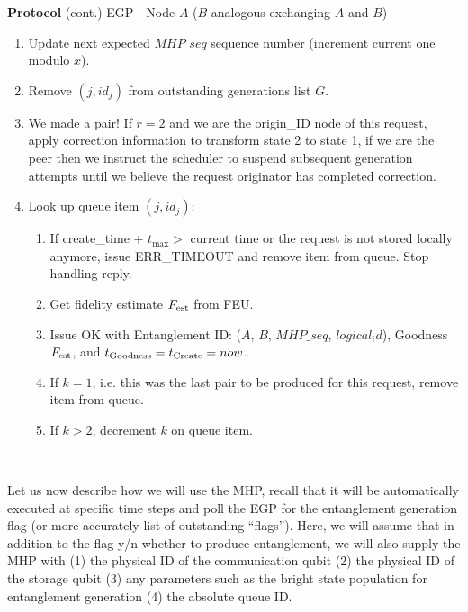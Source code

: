 \documentclass{article}
\makeatletter
\newcounter{Lprotocol}
\newenvironment{Lprotocol}[1]
  {\par\addvspace{\topsep}
   \noindent
   \tabularx{\linewidth}{@{} X @{}}
    \hline
    \refstepcounter{Lprotocol}\textbf{Protocol \theLprotocol} #1 \\
    \hline}
  { \\
    \hline
   \endtabularx
   \par\addvspace{\topsep}}
\makeatother
\begin{document}
\addtocounter{Lprotocol}{-1}
\begin{Lprotocol}{(cont.) EGP - Node $A$ ($B$ analogous exchanging $A$ and $B$)}
\begin{enumerate}
   \begin{enumerate}
   \begin{enumerate}
   \setcounter{enumiii}{\theenumTemp}
    \item Update next expected $MHP\_seq$ sequence number (increment current one modulo $x$).
     \item Remove $(j,id_j)$ from outstanding generations list $G$.
     \item We made a pair! If $r=2$ and we are the origin\_ID node of this request, apply correction information to transform state 2 to state 1, if we are the peer then we instruct the scheduler to suspend subsequent generation attempts until we believe the request originator has completed correction.
     \item Look up queue item $(j,id_j)$:
	 \begin{enumerate}
		\item If create\_time + $t_{\max} >$ current time or the request is not stored locally anymore, issue ERR\_TIMEOUT and remove item from queue. Stop handling reply.
		\item Get fidelity estimate $F_{\rm est}$ from FEU.
		\item Issue OK with Entanglement ID: ($A$, $B$, $MHP\_seq$, $logical_id$), Goodness $F_{\rm est}$, and $t_{\rm Goodness} = t_{\rm Create} = now$.
		\item If $k = 1$, i.e. this was the last pair to be produced for this request, remove item from queue.
		\item If $k > 2$, decrement $k$ on queue item.
	 \end{enumerate}
	\end{enumerate}
  \end{enumerate}
\end{enumerate}

\end{Lprotocol}

Let us now describe how we will use the MHP, recall that it will be automatically executed at specific time steps and poll the EGP for the entanglement generation flag (or more accurately list of outstanding ``flags''). Here, we will assume that in addition to the flag y/n whether to produce entanglement, we will also supply the MHP with (1) the physical ID of the communication qubit (2) the physical ID of the storage qubit (3) any parameters such as the bright state population for entanglement generation (4) the absolute queue ID.
\end{document}
